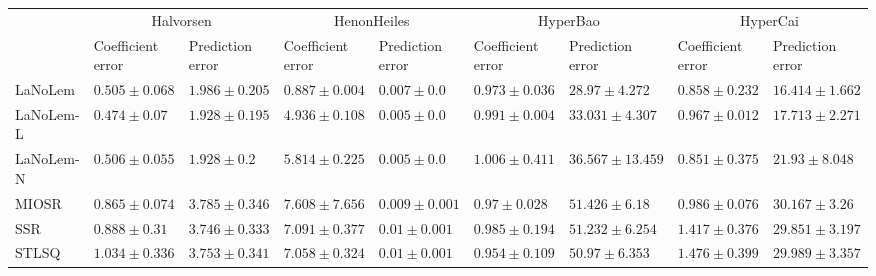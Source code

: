 \begin{table*}
{\begin{tabular}{lllllllll}
 & \multicolumn{2}{c}{Halvorsen} & \multicolumn{2}{c}{HenonHeiles} & \multicolumn{2}{c}{HyperBao} & \multicolumn{2}{c}{HyperCai} \\
 & Coefficient error & Prediction error & Coefficient error & Prediction error & Coefficient error & Prediction error & Coefficient error & Prediction error \\
\midrule
LaNoLem & $0.505\pm 0.068$ & $1.986\pm 0.205$ & $\mathbf{0.887}\pm 0.004$ & $0.007\pm 0.0$ & $0.973\pm 0.036$ & $\mathbf{28.97}\pm 4.272$ & $0.858\pm 0.232$ & $\mathbf{16.414}\pm 1.662$ \\
LaNoLem-L & $\mathbf{0.474}\pm 0.07$ & $\mathbf{1.928}\pm 0.195$ & $4.936\pm 0.108$ & $\mathbf{0.005}\pm 0.0$ & $0.991\pm 0.004$ & $33.031\pm 4.307$ & $0.967\pm 0.012$ & $17.713\pm 2.271$ \\
LaNoLem-N & $0.506\pm 0.055$ & $1.928\pm 0.2$ & $5.814\pm 0.225$ & $0.005\pm 0.0$ & $1.006\pm 0.411$ & $36.567\pm 13.459$ & $\mathbf{0.851}\pm 0.375$ & $21.93\pm 8.048$ \\
MIOSR & $0.865\pm 0.074$ & $3.785\pm 0.346$ & $7.608\pm 7.656$ & $0.009\pm 0.001$ & $0.97\pm 0.028$ & $51.426\pm 6.18$ & $0.986\pm 0.076$ & $30.167\pm 3.26$ \\
SSR & $0.888\pm 0.31$ & $3.746\pm 0.333$ & $7.091\pm 0.377$ & $0.01\pm 0.001$ & $0.985\pm 0.194$ & $51.232\pm 6.254$ & $1.417\pm 0.376$ & $29.851\pm 3.197$ \\
STLSQ & $1.034\pm 0.336$ & $3.753\pm 0.341$ & $7.058\pm 0.324$ & $0.01\pm 0.001$ & $\mathbf{0.954}\pm 0.109$ & $50.97\pm 6.353$ & $1.476\pm 0.399$ & $29.989\pm 3.357$ \\

\midrule


\end{tabular}}
\end{table*}
